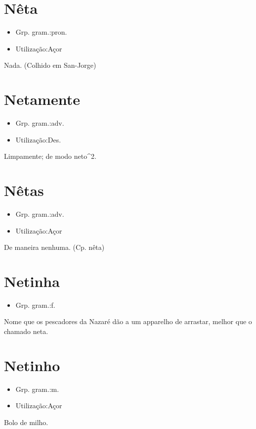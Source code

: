 \section{Nêta}
\begin{itemize}
\item {Grp. gram.:pron.}
\end{itemize}
\begin{itemize}
\item {Utilização:Açor}
\end{itemize}
Nada. (Colhido em San-Jorge)
\section{Netamente}
\begin{itemize}
\item {Grp. gram.:adv.}
\end{itemize}
\begin{itemize}
\item {Utilização:Des.}
\end{itemize}
Limpamente; de modo \textunderscore neto\textunderscore ^2.
\section{Nêtas}
\begin{itemize}
\item {Grp. gram.:adv.}
\end{itemize}
\begin{itemize}
\item {Utilização:Açor}
\end{itemize}
De maneira nenhuma.
(Cp. \textunderscore nêta\textunderscore )
\section{Netinha}
\begin{itemize}
\item {Grp. gram.:f.}
\end{itemize}
Nome que os pescadores da Nazaré dão a um apparelho de arrastar, melhor que o chamado \textunderscore neta\textunderscore .
\section{Netinho}
\begin{itemize}
\item {Grp. gram.:m.}
\end{itemize}
\begin{itemize}
\item {Utilização:Açor}
\end{itemize}
Bolo de milho.
